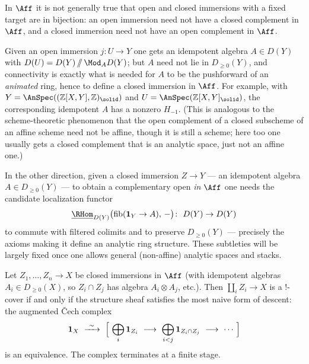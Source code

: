 \begin{remark}
\label{rmk:18:open-vs-closed}
In $\Aff$ it is not generally true that open and closed immersions with a fixed
target are in bijection: an open immersion need not have a closed complement in
$\Aff$, and a closed immersion need not have an open complement in $\Aff$.

Given an open immersion $j\colon U\to Y$ one gets an idempotent algebra $A\in D(Y)$
with $D(U)=D(Y)\,/\!\!/\,\Mod_A D(Y)$; but $A$ need not lie in $D_{\ge0}(Y)$, and
connectivity is exactly what is needed for $A$ to be the pushforward of an
\emph{animated} ring, hence to define a closed immersion in $\Aff$. For example,
with $Y=\AnSpec((\mathbb{Z}[X,Y],\mathbb{Z})_\solid)$ and
$U=\AnSpec(\mathbb{Z}[X,Y]_\solid)$, the corresponding idempotent $A$ has a nonzero
$H_{-1}$. (This is analogous to the scheme-theoretic phenomenon that the open
complement of a closed subscheme of an affine scheme need not be affine, though it
is still a scheme; here too one usually gets a closed complement that is an
analytic space, just not an affine one.)

In the other direction, given a closed immersion $Z\to Y$ --- an idempotent algebra
$A\in D_{\ge0}(Y)$ --- to obtain a complementary open \emph{in $\Aff$} one needs the
candidate localization functor
\begin{equation*}
\underline{\RHom}_{D(Y)}\bigl(\operatorname{fib}(\mathbf 1_Y\to A),\,-\bigr)\colon\ D(Y)\to D(Y)
\end{equation*}
to commute with filtered colimits and to preserve $D_{\ge0}(Y)$ --- precisely the
axioms making it define an analytic ring structure. These subtleties will be
largely fixed once one allows general (non-affine) analytic spaces and stacks.
\end{remark}

\begin{proposition}
\label{prop:18:closed-cover}
Let $Z_1,\dots,Z_n\to X$ be closed immersions in $\Aff$ (with idempotent algebras
$A_i\in D_{\ge0}(X)$, so $Z_i\cap Z_j$ has algebra $A_i\otimes A_j$, etc.). Then
$\coprod_{i} Z_i\to X$ is a $!$-cover if and only if the structure sheaf satisfies
the most naive form of descent: the augmented \v Cech complex
\begin{equation}
\label{eq:18:closed-cech}
\mathbf 1_X\ \xrightarrow{\ \sim\ }\ \Bigl[\ \bigoplus_i \mathbf 1_{Z_i}\ \longrightarrow\ \bigoplus_{i<j}\mathbf 1_{Z_i\cap Z_j}\ \longrightarrow\ \cdots\ \Bigr]
\end{equation}
is an equivalence. The complex terminates at a finite stage.
\end{proposition}


